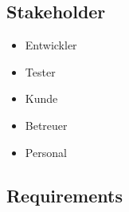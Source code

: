 \documentclass[oneside,a4paper,titlepage]{scrartcl}              %
\begin{document}
\subsection{Stakeholder}
\begin{itemize}
  \item Entwickler
  \item Tester
  \item Kunde
  \item Betreuer
  \item Personal
\end{itemize}

\newpage

\subsection{Requirements}

\end{document}
